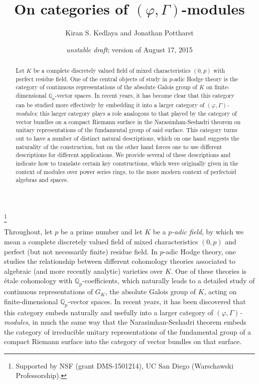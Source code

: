 \documentclass[12pt]{amsart}
\theoremstyle{definition}
\numberwithin{equation}{theorem}
\newcommand{\QQ}{\mathbb{Q}}
\begin{document}
\title{On categories of $(\varphi, \Gamma)$-modules}
\author{Kiran S. Kedlaya and Jonathan Pottharst}
\thanks{Supported by NSF (grant DMS-1501214), UC San Diego (Warschawski Professorship).}
\date{\textit{unstable draft}; version of August 17, 2015}

\begin{abstract}
Let $K$ be a complete discretely valued field of mixed characteristics $(0,p)$ with perfect residue field. One of the central objects of study in $p$-adic Hodge theory is the cate\-gory of continuous representations of the absolute Galois group of $K$ on finite-dimensional $\QQ_p$-vector spaces. In recent years, it has become clear that this category can be studied more effectively by embedding it into a larger category of \emph{$(\varphi, \Gamma)$-modules}; this larger category plays a role analogous to that played by the category of vector bundles on a compact Riemann surface in the Narasimhan-Seshadri theorem on unitary representations of the fundamental group of said surface. This category turns out to have a number of distinct natural descriptions, which on one hand suggests the naturality of the construction, but on the other hand forces one to use different descriptions for different applications. We provide several of these descriptions and indicate how to translate certain key constructions, which were originally given in the context of modules over power series rings, to the more modern context of perfectoid algebras and spaces.
\end{abstract}

\maketitle

Throughout, let $p$ be a prime number and let $K$ be a \emph{$p$-adic field}, by which we mean a complete discretely valued field of mixed characteristics $(0,p)$ and perfect (but not necessarily finite) residue field. In $p$-adic Hodge theory, one studies the relationship between different cohomology theories associated to algebraic (and more recently analytic) varieties over $K$. One of these theories is \'etale cohomology with $\QQ_p$-coefficients, which naturally leads to a detailed study of continuous representations of $G_K$, the absolute Galois group of $K$, acting on finite-dimensional $\QQ_p$-vector spaces. In recent years, it has been discovered that this category embeds naturally and usefully into a larger category of \emph{$(\varphi, \Gamma)$-modules}, in much the same way that the Narasimhan-Seshadri theorem embeds the category of irreducible unitary representations of the fundamental group of a compact Riemann surface into the category of vector bundles on that surface.
\end{document}
